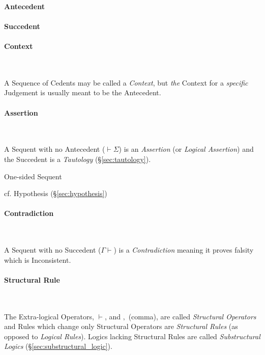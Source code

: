 \paragraph{Antecedent}\label{sec:antecedent}\hfill

\paragraph{Succedent}\label{sec:succedent}\hfill

\paragraph{Context}\label{sec:sequent_context} \hfill \\\hfill

A Sequence of Cedents may be called a \emph{Context}, but \emph{the}
Context for a \emph{specific} Judgement is usually meant to be the
Antecedent.



\paragraph{Assertion}\label{sec:assertion} \hfill \\\hfill

A Sequent with no Antecedent ($\vdash \Sigma$) is an \emph{Assertion}
(or \emph{Logical Assertion}) and the Succedent is a \emph{Tautology}
(\S\ref{sec:tautology}).

One-sided Sequent

\fist cf. Hypothesis (\S\ref{sec:hypothesis})



\paragraph{Contradiction}\label{sec:contradiction} \hfill \\\hfill

A Sequent with no Succedent ($\Gamma \vdash$) is a
\emph{Contradiction} meaning it proves falsity which is
Inconsistent.



\paragraph{Structural Rule}\label{sec:structural_rule} \hfill \\\hfill

The Extra-logical Operators, $\vdash$, and $,$ (comma), are called
\emph{Structural Operators} and Rules which change only Structural
Operators are \emph{Structural Rules} (as opposed to \emph{Logical
  Rules}). Logics lacking Structural Rules are called
\emph{Substructural Logics} (\S\ref{sec:substructural_logic}).




